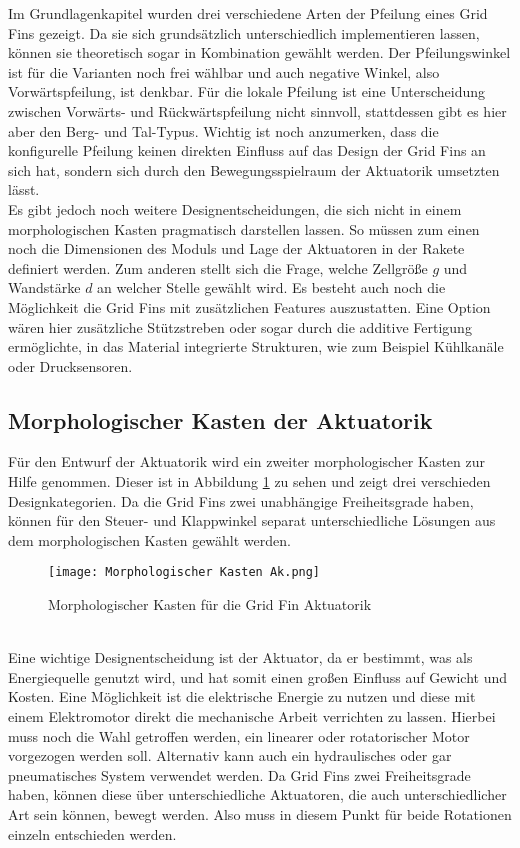 Im Grundlagenkapitel wurden drei verschiedene Arten der Pfeilung eines Grid Fins gezeigt. Da sie sich grundsätzlich unterschiedlich implementieren lassen, können sie theoretisch sogar in Kombination gewählt werden. Der Pfeilungswinkel ist für die Varianten noch frei wählbar und auch negative Winkel, also Vorwärtspfeilung, ist denkbar. Für die lokale Pfeilung ist eine Unterscheidung zwischen Vorwärts- und Rückwärtspfeilung nicht sinnvoll, stattdessen gibt es hier aber den Berg- und Tal-Typus. Wichtig ist noch anzumerken, dass die konfigurelle Pfeilung keinen direkten Einfluss auf das Design der Grid Fins an sich hat, sondern sich durch den Bewegungsspielraum der Aktuatorik umsetzten lässt.\\
Es gibt jedoch noch weitere Designentscheidungen, die sich nicht in einem morphologischen Kasten pragmatisch darstellen lassen. So müssen zum einen noch die Dimensionen des Moduls und Lage der Aktuatoren in der Rakete definiert werden. Zum anderen stellt sich die Frage, welche Zellgröße $g$ und Wandstärke $d$ an welcher Stelle gewählt wird. Es besteht auch noch die Möglichkeit die Grid Fins mit zusätzlichen Features auszustatten. Eine Option wären hier zusätzliche Stützstreben oder sogar durch die additive Fertigung ermöglichte, in das Material integrierte Strukturen, wie zum Beispiel Kühlkanäle oder Drucksensoren.
\subsection{Morphologischer Kasten der Aktuatorik}
Für den Entwurf der Aktuatorik wird ein zweiter morphologischer Kasten zur Hilfe genommen. Dieser ist in Abbildung \ref{abb_MorphKastAk} zu sehen und zeigt drei verschieden Designkategorien. Da die Grid Fins zwei unabhängige Freiheitsgrade haben, können für den Steuer- und Klappwinkel separat unterschiedliche Lösungen aus dem morphologischen Kasten gewählt werden.
\begin{figure}[h]
	\centering
	\texttt{[image: Morphologischer Kasten Ak.png]}
	\caption{Morphologischer Kasten für die Grid Fin Aktuatorik}
	\label{abb_MorphKastAk}
\end{figure}\\
Eine wichtige Designentscheidung ist der Aktuator, da er bestimmt, was als Energiequelle genutzt wird, und hat somit einen großen Einfluss auf Gewicht und Kosten. Eine Möglichkeit ist die elektrische Energie zu nutzen und diese mit einem Elektromotor direkt die mechanische Arbeit verrichten zu lassen. Hierbei muss noch die Wahl getroffen werden, ein linearer oder rotatorischer Motor vorgezogen werden soll. Alternativ kann auch ein hydraulisches oder gar pneumatisches System verwendet werden. Da Grid Fins zwei Freiheitsgrade haben, können diese über unterschiedliche Aktuatoren, die auch unterschiedlicher Art sein können, bewegt werden. Also muss in diesem Punkt für beide Rotationen einzeln entschieden werden.

